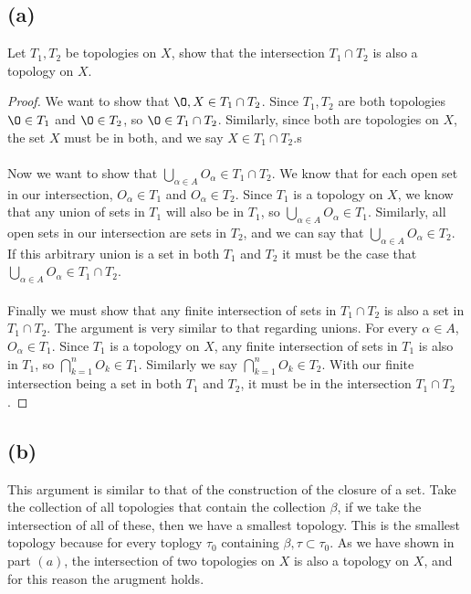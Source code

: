 \documentclass{article}
\begin{document}
\subsection*{(a)}
Let $T_1, T_2$ be topologies on $X$, show that the intersection $T_1 \cap T_2$ is also a topology on $X$.
\begin{proof}
    We want to show that $\O, X \in T_1 \cap T_2$.
    Since $T_1, T_2$ are both topologies $\O \in T_1$ and $\O \in T_2$, so $\O \in T_1 \cap T_2$.
    Similarly, since both are topologies on $X$, the set $X$ must be in both, and we say $X \in T_1 \cap T_2$.s
    \\\\
    Now we want to show that $\bigcup_{\alpha \in A}O_\alpha \in T_1 \cap T_2$.
    We know that for each open set in our intersection, $O_\alpha \in T_1$ and $O_\alpha \in T_2$.
    Since $T_1$ is a topology on $X$, we know that any union of sets in $T_1$ will also be in $T_1$, so $\bigcup_{\alpha \in A}O_\alpha \in T_1$.
    Similarly, all open sets in our intersection are sets in $T_2$, and we can say that $\bigcup_{\alpha \in A}O_\alpha \in T_2$.
    If this arbitrary union is a set in both $T_1$ and $T_2$ it must be the case that $\bigcup_{\alpha \in A}O_\alpha \in T_1 \cap T_2$.
    \\\\
    Finally we must show that any finite intersection of sets in $T_1 \cap T_2$ is also a set in $T_1 \cap T_2$.
    The argument is very similar to that regarding unions.
    For every $\alpha \in A$, $O_\alpha \in T_1$.
    Since $T_1$ is a topology on $X$, any finite intersection of sets in $T_1$ is also in $T_1$, so $\bigcap_{k=1}^n O_k \in T_1$.
    Similarly we say $\bigcap_{k=1}^n O_k \in T_2$.
    With our finite intersection being a set in both $T_1$ and $T_2$, it must be in the intersection $T_1 \cap T_2$.
\end{proof}
\subsection*{(b)}
This argument is similar to that of the construction of the closure of a set.
Take the collection of all topologies that contain the collection $\beta$, if we take the intersection of all of these, then we have a smallest topology.
This is the smallest topology because for every toplogy $\tau_0$ containing $\beta, \tau \subset \tau_0$.
As we have shown in part $(a)$, the intersection of two topologies on $X$ is also a topology on $X$, and for this reason the arugment holds.
\end{document}
